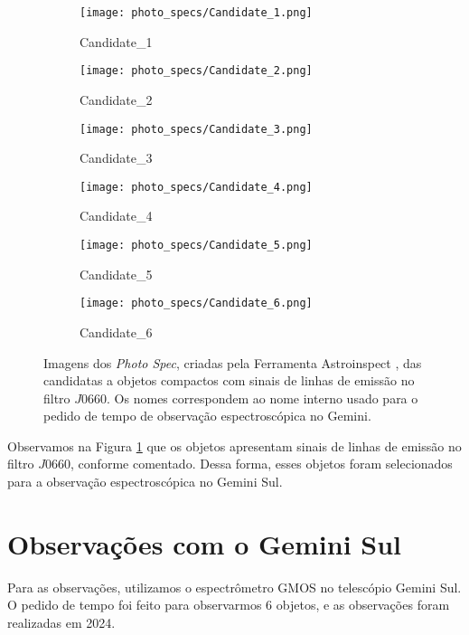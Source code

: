 \begin{figure}[!ht]
    \centering
    \captionsetup{justification=centering}
    \begin{subfigure}[b]{0.3\textwidth}
        \texttt{[image: photo\_specs/Candidate\_1.png]}
        \caption{Candidate\_1}
    \end{subfigure}
    \begin{subfigure}[b]{0.3\textwidth}
        \texttt{[image: photo\_specs/Candidate\_2.png]}
        \caption{Candidate\_2}
    \end{subfigure}
    \begin{subfigure}[b]{0.3\textwidth}
        \texttt{[image: photo\_specs/Candidate\_3.png]}
        \caption{Candidate\_3}
    \end{subfigure}
    \begin{subfigure}[b]{0.3\textwidth}
        \texttt{[image: photo\_specs/Candidate\_4.png]}
        \caption{Candidate\_4}
    \end{subfigure}
    \begin{subfigure}[b]{0.3\textwidth}
        \texttt{[image: photo\_specs/Candidate\_5.png]}
        \caption{Candidate\_5}
    \end{subfigure}
    \begin{subfigure}[b]{0.3\textwidth}
        \texttt{[image: photo\_specs/Candidate\_6.png]}
        \caption{Candidate\_6}
    \end{subfigure}
    \caption{Imagens dos \textit{Photo Spec}, criadas pela Ferramenta Astroinspect \cite{astroinspect}, das candidatas a objetos compactos com sinais de linhas de emissão no filtro $J0660$. Os nomes correspondem ao nome interno usado para o pedido de tempo de observação espectroscópica no Gemini.}
    \label{photo_spec_candidatas}
\end{figure}

Observamos na Figura \ref{photo_spec_candidatas} que os objetos apresentam sinais de linhas de emissão no filtro $J0660$, conforme comentado. Dessa forma, esses objetos foram selecionados para a observação espectroscópica no Gemini Sul.


\section{Observações com o Gemini Sul}\label{section:observacoes_gemini_sul_2}
Para as observações, utilizamos o espectrômetro GMOS no telescópio Gemini Sul. O pedido de tempo foi feito para observarmos 6 objetos, e as observações foram realizadas em 2024.


